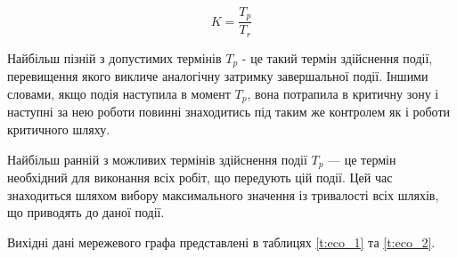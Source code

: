 \begin{equation}
	K=\frac{T_{p}}{T_{r}}
\end{equation}

\par Найбільш пізній з допустимих термінів $T_{p}$ - це такий термін здійснення події, перевищення якого викличе аналогічну затримку завершальної події. Іншими словами, якщо подія наступила в момент $T_{p}$, вона потрапила в критичну зону і наступні за нею роботи повинні знаходитись під таким же контролем як і роботи критичного шляху.

\par Найбільш ранній з можливих термінів здійснення події $T_{p}$ --- це термін необхідний для виконання всіх робіт, що передують цій події. Цей час знаходиться шляхом вибору максимального значення із тривалості всіх шляхів, що приводять до даної події.
\par Вихідні дані мережевого графа представлені в таблицях \ref{t:eco_1} та \ref{t:eco_2}.


